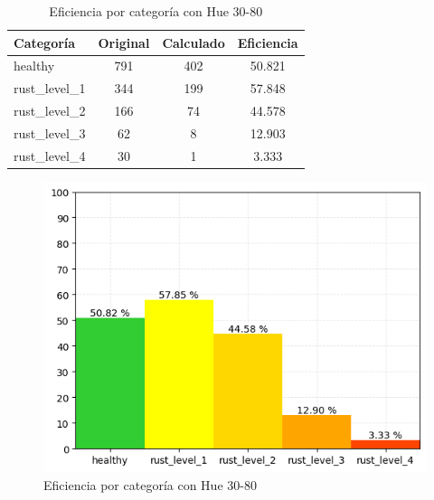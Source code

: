 \captionsetup[figure]{skip=10pt}

\begin{table}[H]
\centering
\begin{tabular}{|l|c|c|c|}
\hline 
\textbf{Categoría} & \textbf{Original} & \textbf{Calculado} & \textbf{Eficiencia} \\
\hline
healthy & 791 & 402 & 50.821 \\
\hline 
rust\_level\_1 & 344 & 199 & 57.848 \\
\hline 
rust\_level\_2 & 166 & 74 & 44.578 \\
\hline 
rust\_level\_3 & 62 & 8 & 12.903 \\
\hline 
rust\_level\_4 & 30 & 1 & 3.333 \\
\hline 
\end{tabular}
\caption{Eficiencia por categoría con Hue 30-80}
\label{table:efficiency_categories_30_80}
\end{table}

\begin{figure}[H]
\centering
\includegraphics[scale=0.6]{images/result_classes_30_80.png}
\caption{Eficiencia por categoría con Hue 30-80}
\label{img:efficiency_categories_30_80}
\end{figure}
